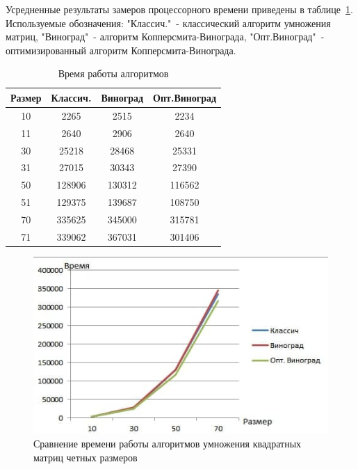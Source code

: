 \documentclass[12pt]{report}
\begin{document}
    Усредненные результаты замеров процессорного времени приведены в таблице~\ref{table:time}.
    Используемые обозначения: "Классич."\ - классический алгоритм умножения матриц,
    "Виноград"\ - алгоритм Копперсмита-Винограда,
    "Опт.Виноград"\ - оптимизированный алгоритм Копперсмита-Винограда.

    \begin{table}[h]
        \begin{center}
            \captionsetup{justification=raggedright, singlelinecheck=false}
            \caption{\label{table:time} Время работы алгоритмов}
            \begin{tabular}{|c c c c|}
                \hline
                Размер & Классич. & Виноград & Опт.Виноград\\ [0.5ex]
                \hline
                10     & 2265     & 2515     & 2234         \\
                \hline
                11     & 2640     & 2906     & 2640         \\
                \hline
                30     & 25218    & 28468    & 25331        \\
                \hline
                31     & 27015    & 30343    & 27390        \\
                \hline
                50     & 128906   & 130312   & 116562       \\
                \hline
                51     & 129375   & 139687   & 108750       \\
                \hline
                70     & 335625   & 345000   & 315781       \\
                \hline
                71     & 339062   & 367031   & 301406       \\
                \hline
            \end{tabular}
        \end{center}
    \end{table}

    \begin{figure}[H]
        \centering
        \includegraphics[width=0.75\linewidth]{img/graph_even}
        \caption{Сравнение времени работы алгоритмов умножения квадратных матриц четных размеров}
        \label{fig:odd_graph}
    \end{figure}
\end{document}
